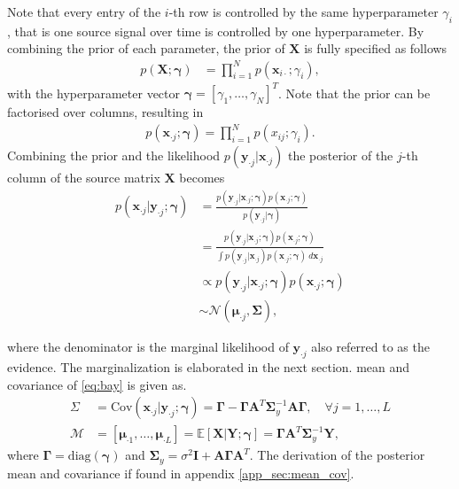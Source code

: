 Note that every entry of the $i$-th row is controlled by the same hyperparameter $\gamma_i$, that is one source signal over time is controlled by one hyperparameter. 
By combining the prior of each parameter, the prior of $\textbf{X}$ is fully specified as follows 
\begin{align*}
p (\mathbf{X} ; \boldsymbol{\gamma}) &= \prod_{i=1}^N p (\mathbf{x}_{i \cdot} ; \gamma_i),
\end{align*}
with the hyperparameter vector $\boldsymbol{\gamma} = [\gamma_1, \dots, \gamma_N]^T$. Note that the prior can be factorised over columns, resulting in 
\begin{align*}
p\left(\textbf{x}_{\cdot j};\boldsymbol{\gamma}\right) = \prod_{i=1}^{N}p\left( x_{ij};\gamma_{i}\right).
\end{align*} 
Combining the prior and the likelihood $p(\mathbf{y}_{\cdot j} \vert \mathbf{x}_{\cdot j})$ the posterior of the $j$-th column of the source matrix $\mathbf{X}$ becomes
\begin{align}
p(\mathbf{x}_{\cdot j} \vert \mathbf{y}_{\cdot j} ; \boldsymbol{\gamma}) &= \frac{p(\mathbf{y}_{\cdot j} | \mathbf{x}_{\cdot j} ; \boldsymbol{\gamma}) p(\mathbf{x}_{\cdot j} ; \boldsymbol{\gamma})}{p(\mathbf{y}_{\cdot j} | \boldsymbol{\gamma})} \nonumber \\
&= \frac{p(\mathbf{y}_{\cdot j} | \mathbf{x}_{\cdot j} ; \boldsymbol{\gamma}) p(\mathbf{x}_{\cdot j} ; \boldsymbol{\gamma})}{\int p(\mathbf{y}_{\cdot j} | \mathbf{x}_{\cdot j}) p(\mathbf{x}_{\cdot j} ; \boldsymbol{\gamma}) \ d \mathbf{x}_{\cdot j}} \nonumber \\ 
&\propto p(\mathbf{y}_{\cdot j} | \mathbf{x}_{\cdot j} ; \boldsymbol{\gamma}) p(\mathbf{x}_{\cdot j} ; \boldsymbol{\gamma}) \nonumber \\
&\sim \mathcal{N}(\boldsymbol{\mu}_{\cdot j}, \boldsymbol{\Sigma}),\label{eq:bay}
\end{align}

where the denominator is the marginal likelihood of $\mathbf{y}_{\cdot j}$ also referred to as the evidence. The marginalization is elaborated in the next section. mean and covariance of \eqref{eq:bay} is given as.
\begin{align}
\Sigma &= \text{Cov}(\mathbf{x}_{\cdot j} \vert \mathbf{y}_{\cdot j} ; \boldsymbol{\gamma}) = \boldsymbol{\Gamma} - \boldsymbol{\Gamma} \mathbf{A}^T \boldsymbol{\Sigma}_y^{-1} \mathbf{A} \boldsymbol{\Gamma}, \quad \forall j = 1, \dots, L \label{eq:moments1} \\
\mathcal{M} &= [\boldsymbol{\mu}_{\cdot 1}, \dots, \boldsymbol{\mu}_{\cdot L}] = \mathbb{E}[\mathbf{X} \vert \mathbf{Y} ; \boldsymbol{\gamma}] = \boldsymbol{\Gamma} \mathbf{A}^T \boldsymbol{\Sigma}_y^{-1} \mathbf{Y}, \label{eq:moments2} 
\end{align}
where $\boldsymbol{\Gamma} = \text{diag}(\boldsymbol{\gamma})$ and $\boldsymbol{\Sigma}_y = \sigma^2 \mathbf{I} + \mathbf{A} \boldsymbol{\Gamma} \mathbf{A}^T$. The derivation of the posterior mean and covariance if found in appendix \ref{app_sec:mean_cov}.   

